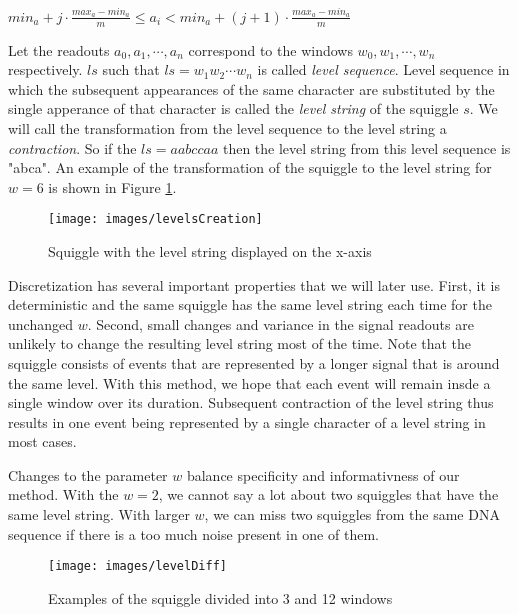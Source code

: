\begin{center}
$min_a + j\cdot \frac{max_a-min_a}{m} \leq a_i < min_a + (j+1)\cdot \frac{max_a-min_a}{m}$
\end{center}

Let the readouts $a_0, a_1, \cdots, a_n$ correspond to the windows $w_0, w_1, \cdots ,w_n$
respectively. $ls$ such that $ls=w_1w_2\cdots w_n$ is called \textit{level sequence}.
Level sequence in which the subsequent appearances of the same character are substituted
by the single apperance of that character is called the \textit{level string} of the squiggle $s$.
We will call the transformation from the level sequence to the level string a \textit{contraction}.
So if the $ls=aabccaa$ then the level string from this level sequence is "abca". An example of the transformation
of the squiggle to the level string for $w=6$ is shown in Figure \ref{obr:levelsCreation}.

\begin{figure}
\centerline{\texttt{[image: images/levelsCreation]}}
\caption[TODO]{Squiggle with the level string displayed on the x-axis}
\label{obr:levelsCreation}
\end{figure}

Discretization has several important properties that we will later use.
First, it is deterministic and the same squiggle has the same level
string each time for the unchanged $w$. Second, small changes and variance in the signal readouts
are unlikely to change the resulting level string most of the time. Note that the squiggle
consists of events that are represented by a longer signal that is around the same level.
With this method, we hope that each event will remain insde a single window over its
duration. Subsequent contraction of the level string thus results in one event being represented by
a single character of a level string in most cases.

Changes to the parameter $w$ balance specificity and informativness of our method.
With the $w=2$, we cannot say a lot about two squiggles that have the same level string.
With larger $w$, we can miss two squiggles from the same DNA sequence if there is
a too much noise present in one of them.

\begin{figure}
\centerline{\texttt{[image: images/levelDiff]}}
\caption[TODO]{Examples of the squiggle divided into 3 and 12 windows}
\label{obr:levelDiff}
\end{figure}

